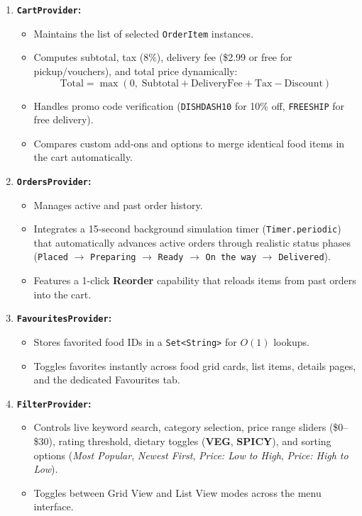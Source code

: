 \documentclass[11pt,a4paper]{article}
\begin{document}
\begin{enumerate}[leftmargin=*]
    \item \textbf{\texttt{CartProvider}:}
    \begin{itemize}
        \item Maintains the list of selected \texttt{OrderItem} instances.
        \item Computes subtotal, tax ($8\%$), delivery fee (\$2.99 or free for pickup/vouchers), and total price dynamically:
        \[ \text{Total} = \max\left(0, \; \text{Subtotal} + \text{DeliveryFee} + \text{Tax} - \text{Discount}\right) \]
        \item Handles promo code verification (\texttt{DISHDASH10} for 10\% off, \texttt{FREESHIP} for free delivery).
        \item Compares custom add-ons and options to merge identical food items in the cart automatically.
    \end{itemize}

    \item \textbf{\texttt{OrdersProvider}:}
    \begin{itemize}
        \item Manages active and past order history.
        \item Integrates a 15-second background simulation timer (\texttt{Timer.periodic}) that automatically advances active orders through realistic status phases (\texttt{Placed} $\rightarrow$ \texttt{Preparing} $\rightarrow$ \texttt{Ready} $\rightarrow$ \texttt{On the way} $\rightarrow$ \texttt{Delivered}).
        \item Features a 1-click \textbf{Reorder} capability that reloads items from past orders into the cart.
    \end{itemize}

    \item \textbf{\texttt{FavouritesProvider}:}
    \begin{itemize}
        \item Stores favorited food IDs in a \texttt{Set<String>} for $O(1)$ lookups.
        \item Toggles favorites instantly across food grid cards, list items, details pages, and the dedicated Favourites tab.
    \end{itemize}

    \item \textbf{\texttt{FilterProvider}:}
    \begin{itemize}
        \item Controls live keyword search, category selection, price range sliders (\$0--\$30), rating threshold, dietary toggles (\textbf{VEG}, \textbf{SPICY}), and sorting options (\textit{Most Popular}, \textit{Newest First}, \textit{Price: Low to High}, \textit{Price: High to Low}).
        \item Toggles between Grid View and List View modes across the menu interface.
    \end{itemize}
\end{enumerate}
\end{document}
